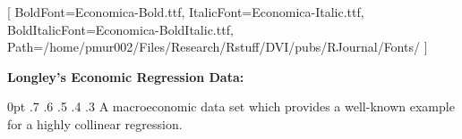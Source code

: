 \documentclass[varwidth]{standalone}
\begin{document}
\setmainfont{Economica-Regular.ttf}[
  BoldFont=Economica-Bold.ttf,
  ItalicFont=Economica-Italic.ttf,
  BoldItalicFont=Economica-BoldItalic.ttf,
  Path=/home/pmur002/Files/Research/Rstuff/DVI/pubs/RJournal/Fonts/ 
]
\fontsize{14}{16}\selectfont
\begin{minipage}{3in}
{\bf Longley's Economic Regression Data:}

0pt .7\textwidth
0pt .6\textwidth
0pt .5\textwidth
0pt .4\textwidth
0pt .3\textwidth
A macroeconomic data set which provides a well-known example for a
highly collinear regression.

\end{minipage}
\end{document}
